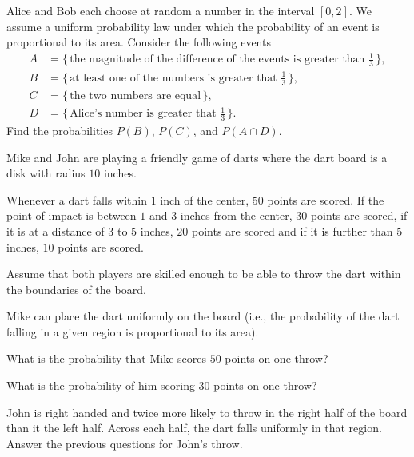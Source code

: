 \begin{problem}
  Alice and Bob each choose at random a number in the interval
  \([0,2]\). We assume a uniform probability law under which the
  probability of an event is proportional to its area. Consider the
  following events
  \begin{align*}
    A&=\bigl\{\,\text{the magnitude of the difference of the events is
       greater than \(\tfrac{1}{3}\)}\,\bigr\},\\
    B&=\bigl\{\,\text{at least one of the numbers is greater that
       \(\tfrac{1}{3}\)}\,\bigr\},\\
    C&=\bigl\{\,\text{the two numbers are equal}\,\bigr\},\\
    D&=\bigl\{\,\text{Alice's number is greater that \(\tfrac{1}{3}\)}\,\bigr\}.
  \end{align*}
  Find the probabilities \(P(B)\), \(P(C)\), and \(P(A\cap D)\).
\end{problem}
\begin{solution*}
\end{solution*}

\begin{problem}
  Mike and John are playing a friendly game of darts where the dart board
  is a disk with radius \(10\) inches.

  Whenever a dart falls within \(1\) inch of the center, \(50\) points are
  scored. If the point of impact is between \(1\) and \(3\) inches from the
  center, \(30\) points are scored, if it is at a distance of \(3\) to
  \(5\) inches, \(20\) points are scored and if it is further than \(5\)
  inches, \(10\) points are scored.

  Assume that both players are skilled enough to be able to throw the dart
  within the boundaries of the board.

  Mike can place the dart uniformly on the board (i.e., the probability of
  the dart falling in a given region is proportional to its area).
  \begin{alphlist}
  \item What is the probability that Mike scores \(50\) points on one
    throw?
  \item What is the probability of him scoring \(30\) points on one throw?
  \item John is right handed and twice more likely to throw in the right
    half of the board than it the left half. Across each half, the dart
    falls uniformly in that region. Answer the previous questions for
    John's throw.
  \end{alphlist}
\end{problem}
\begin{solution*}
\end{solution*}


